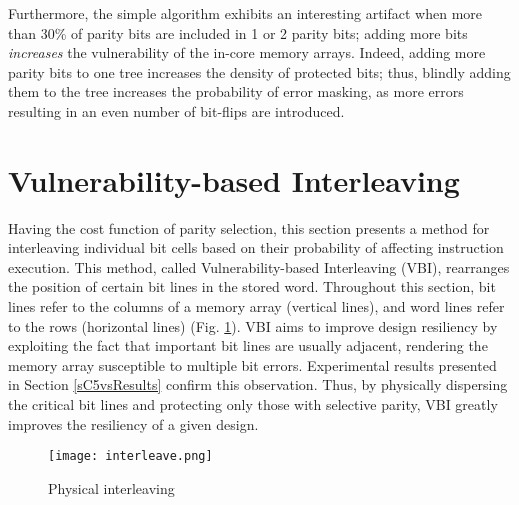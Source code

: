\documentclass[12pt]{yalephd}
\begin{document}
Furthermore, the simple algorithm exhibits an interesting artifact when more than 30\% of parity bits are included in 1 or 2 parity bits; adding more bits {\em increases} the vulnerability of the in-core memory arrays. Indeed, adding more parity bits to one tree increases the density of protected bits; thus, blindly adding them to the tree increases the probability of error masking, as more errors resulting in an even number of bit-flips are introduced.

\section{Vulnerability-based Interleaving}\label{sC5sVBI}

Having the cost function of parity selection, this section presents a method for interleaving individual bit cells based on their probability of affecting instruction execution. This method, called Vulnerability-based Interleaving (VBI), rearranges the position of certain bit lines in the stored word. Throughout this section, bit lines refer to the columns of a memory array (vertical lines), and word lines refer to the rows (horizontal lines) (Fig. \ref{sC5fInterleave}). VBI aims to improve design resiliency by exploiting the fact that important bit lines are usually adjacent, rendering the memory array susceptible to multiple bit errors. Experimental results presented in Section \ref{sC5vsResults} confirm this observation. Thus, by physically dispersing the critical bit lines and protecting only those with selective parity, VBI greatly improves the resiliency of a given design.

\begin{figure}[!ht]%
\centering
\texttt{[image: interleave.png]}%
\caption{Physical interleaving \cite{slayman2005cache}}%
\label{sC5fInterleave}%
\end{figure}
\end{document}
